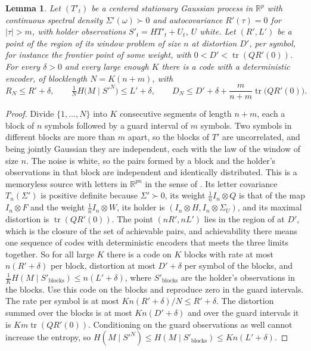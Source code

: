 \documentclass[11pt,onecolumn]{IEEEtran}
\newtheorem{lemma}[theorem]{Lemma}
\newcommand{\R}{\mathbb{R}}
\newcommand{\tr}{\operatorname{tr}}
\begin{document}
\begin{lemma}\label{lem:guard}
Let $(T'_t)$ be a centered stationary Gaussian process in $\R^p$ with
continuous spectral density $\Sigma'(\omega)\succ0$ and autocovariance
$R'(\tau)=0$ for $|\tau|>m$, with holder observations
$S'_t=HT'_t+U_t$, $U$ white. Let $(R',L')$ be a point of the region of
its window problem of size $n$ at distortion $D'$, per symbol, for
instance the frontier point of some weight, with
$0<D'<\tr(QR'(0))$. For every
$\delta>0$ and every large enough $K$ there is a code with a
deterministic encoder, of blocklength $N=K(n+m)$, with
\[
R_N\le R'+\delta,\qquad
\tfrac1NH\bigl(M\mid S'^N\bigr)\le L'+\delta,\qquad
D_N\le D'+\delta+\frac{m}{n+m}\tr\bigl(QR'(0)\bigr).
\]
\end{lemma}

\begin{proof}
Divide $\{1,\dots,N\}$ into $K$ consecutive segments of length $n+m$,
each a block of $n$ symbols followed by a guard interval of $m$ symbols.
Two symbols in different blocks are more than $m$ apart, so the blocks
of $T'$ are uncorrelated, and being jointly Gaussian they are
independent, each with the law of the window of size $n$. The noise is
white, so the pairs formed by a block and the holder's observations in
that block are independent and identically distributed. This is a
memoryless source with letters in $\R^{pn}$ in the sense of
\cite{part1}. Its letter covariance $T_n(\Sigma')$ is positive definite
because $\Sigma'\succ0$, its weight $\tfrac1nI_n\otimes Q$ is that of the
map $I_n\otimes F$ and the weight $\tfrac1nI_n\otimes W$, its holder is
$(I_n\otimes H,I_n\otimes\Sigma_U)$, and its maximal distortion is
$\tr(QR'(0))$. The point $(nR',nL')$ lies in the region of
\cite[Theorem~3]{part1} at $D'$, which is the closure of the set of
achievable pairs, and achievability there means one sequence of codes
with deterministic encoders that meets the three limits together. So
for all large $K$ there is a code on $K$
blocks with rate at most $n(R'+\delta)$ per block, distortion at most
$D'+\delta$ per symbol of the blocks, and
$\tfrac1KH(M\mid S'_{\mathrm{blocks}})\le n(L'+\delta)$, where
$S'_{\mathrm{blocks}}$ are the holder's observations in the blocks. Use
this code on the blocks and reproduce zero in the guard intervals. The
rate per symbol is at most $Kn(R'+\delta)/N\le R'+\delta$. The
distortion summed over the blocks is at most $Kn(D'+\delta)$ and over
the guard intervals it is $Km\tr(QR'(0))$. Conditioning on the guard
observations as well cannot increase the entropy, so
$H(M\mid S'^N)\le H(M\mid S'_{\mathrm{blocks}})\le Kn(L'+\delta)$.
\end{proof}
\end{document}
